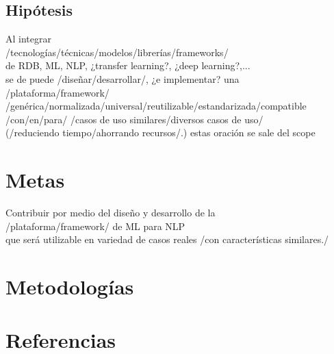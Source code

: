 \documentclass[letterpaper]{article}
\begin{document}
\subsection {Hipótesis}
Al integrar\\
/tecnologías/técnicas/modelos/librerías/frameworks/\\
de RDB, ML, NLP, ¿transfer learning?, ¿deep learning?,...\\
se de puede /diseñar/desarrollar/, ¿e implementar? una\\
/plataforma/framework/\\
/genérica/normalizada/universal/reutilizable/estandarizada/compatible\\
/con/en/para/ /casos de uso similares/diversos casos de uso/\\
(/reduciendo tiempo/ahorrando recursos/.) estas oración se sale del scope

\section {Metas}
Contribuir por medio del diseño y desarrollo de la\\
/plataforma/framework/ de ML para NLP\\
que será utilizable en variedad de casos reales /con características similares./
\section {Metodologías}
\newpage
\section {Referencias}
\printbibliography[heading=none]
\end{document}
